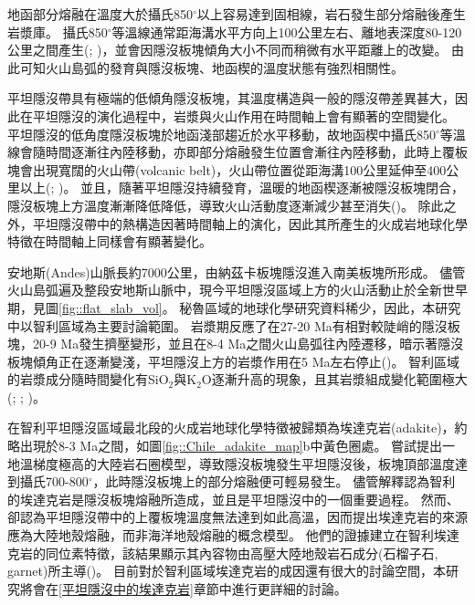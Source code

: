地函部分熔融在溫度大於攝氏850$^{\circ}$以上容易達到固相線，岩石發生部分熔融後產生岩漿庫。
攝氏850$^{\circ}$等溫線通常距海溝水平方向上100公里左右、離地表深度80-120公里之間產生(\citealp{peacock1990fluid}; \citealp{hyndman2003serpentinization})，並會因隱沒板塊傾角大小不同而稍微有水平距離上的改變。
由此可知火山島弧的發育與隱沒板塊、地函楔的溫度狀態有強烈相關性。

平坦隱沒帶具有極端的低傾角隱沒板塊，其溫度構造與一般的隱沒帶差異甚大，因此在平坦隱沒的演化過程中，岩漿與火山作用在時間軸上會有顯著的空間變化。
平坦隱沒的低角度隱沒板塊於地函淺部趨近於水平移動，故地函楔中攝氏850$^{\circ}$等溫線會隨時間逐漸往內陸移動，亦即部分熔融發生位置會漸往內陸移動，此時上覆板塊會出現寬闊的火山帶(volcanic belt)，火山帶位置從距海溝100公里延伸至400公里以上(\citealp{Gutscher2000A}; \citealp{Manea2017})。
並且，隨著平坦隱沒持續發育，溫暖的地函楔逐漸被隱沒板塊閉合，隱沒板塊上方溫度漸漸降低降低，導致火山活動度逐漸減少甚至消失(\citealp{Gutscher2000Bcan})。
除此之外，平坦隱沒帶中的熱構造因著時間軸上的演化，因此其所產生的火成岩地球化學特徵在時間軸上同樣會有顯著變化。

安地斯(Andes)山脈長約7000公里，由納茲卡板塊隱沒進入南美板塊所形成。
儘管火山島弧遍及整段安地斯山脈中，現今平坦隱沒區域上方的火山活動止於全新世早期，見圖\ref{fig::flat_slab_vol}。
秘魯區域的地球化學研究資料稀少，因此，本研究中以智利區域為主要討論範圍。
岩漿期反應了在27-20 Ma有相對較陡峭的隱沒板塊，20-9 Ma發生擠壓變形，並且在8-4 Ma之間火山島弧往內陸遷移，暗示著隱沒板塊傾角正在逐漸變淺，平坦隱沒上方的岩漿作用在5 Ma左右停止(\citealp{kay2002magmatism})。
智利區域的岩漿成分隨時間變化有SiO$_2$與K$_2$O逐漸升高的現象，且其岩漿組成變化範圍極大(\citealp{kay1988tertiary}; \citealp{kay2002magmatism}; \citealp{goss2013andean})。

在智利平坦隱沒區域最北段的火成岩地球化學特徵被歸類為埃達克岩(adakite)，約略出現於8-3 Ma之間，如圖\ref{fig::Chile_adakite_map}b中黃色圈處。
\citet{Gutscher2000Bcan}嘗試提出一地溫梯度極高的大陸岩石圈模型，導致隱沒板塊發生平坦隱沒後，板塊頂部溫度達到攝氏700-800$^{\circ}$，此時隱沒板塊上的部分熔融便可輕易發生。
儘管\citet{Gutscher2000Bcan}解釋認為智利的埃達克岩是隱沒板塊熔融所造成，並且是平坦隱沒中的一個重要過程。
然而\citet{kay2002magmatism}、\citet{goss2013andean}卻認為平坦隱沒帶中的上覆板塊溫度無法達到如此高溫，因而提出埃達克岩的來源應為大陸地殼熔融，而非海洋地殼熔融的概念模型。
他們的證據建立在智利埃達克岩的同位素特徵，該結果顯示其內容物由高壓大陸地殼岩石成分(石榴子石, garnet)所主導(\citealp{kay2002magmatism})。
目前對於智利區域埃達克岩的成因還有很大的討論空間，本研究將會在\ref{平坦隱沒中的埃達克岩}章節中進行更詳細的討論。


